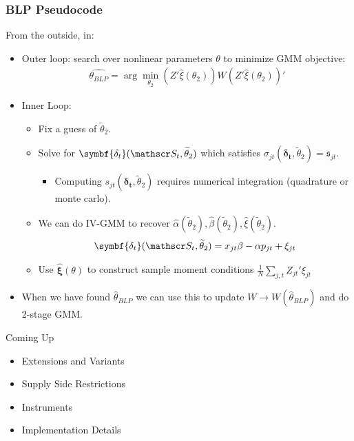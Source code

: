 \documentclass[aspectratio=169,11pt]{beamer}
\begin{document}
 \begin{frame}
\frametitle{BLP Pseudocode}
\footnotesize
From the outside, in:
\begin{itemize}
\item Outer loop: search over nonlinear parameters $\theta$ to minimize GMM objective:
 \begin{align*}
 \widehat{\theta_{BLP}} = \arg \min_{\theta_2} (Z' \hat{\xi}(\theta_2)) W  (Z' \hat{\xi}(\theta_2))'
 \end{align*}
 \item Inner Loop:
 \begin{itemize}
\item Fix a guess of $\widetilde{\theta}_2$.
\item Solve for $\symbf{\delta_t}(\calS_t,\widetilde{\theta}_2)$ which satisfies $\sigma_{jt}(\symbf{\delta_t},\widetilde{\theta}_2) = \mathfrak{s}_{jt}$.
\begin{itemize}
\item Computing $s_{jt}(\symbf{\delta_t},\widetilde{\theta}_2)$ requires numerical integration (quadrature or monte carlo).
\end{itemize}
 \item We can do IV-GMM to recover $\hat{\alpha}(\widetilde{\theta}_2),\hat{\beta}(\widetilde{\theta}_2),\hat{\xi}(\widetilde{\theta}_2)$.
  \begin{align*}
\symbf{\delta_t}(\calS_t,\widetilde{\theta}_2)= x_{jt} \beta -\alpha p_{jt}+  \xi_{jt}
 \end{align*}
  \item Use $\symbf{\hat{\xi}}(\theta)$ to construct sample moment conditions $\frac{1}{N} \sum_{j,t} Z_{jt}' \xi_{jt}$
 \end{itemize}
 \item When we have found $\hat{\theta}_{BLP}$ we can use this to update $W \rightarrow W(\hat{\theta}_{BLP})$ and do 2-stage GMM.
 \end{itemize}
\end{frame}

\begin{frame}{Coming Up}
\begin{itemize}
\item Extensions and Variants
\item Supply Side Restrictions
\item Instruments
\item Implementation Details
\end{itemize}

\end{frame}
\end{document}
